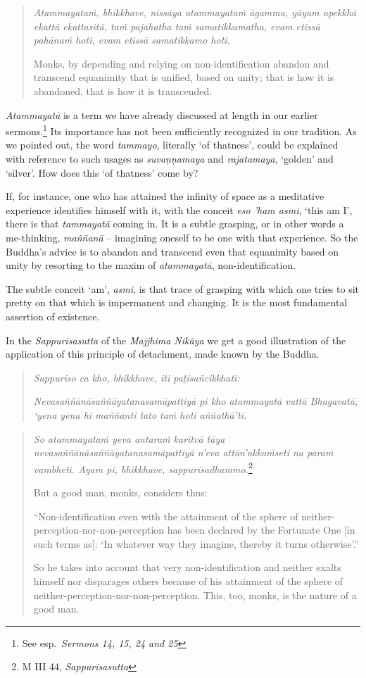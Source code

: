 \begin{quote}
\emph{Atammayataṁ, bhikkhave, nissāya atammayataṁ āgamma, yāyam upekkhā ekattā ekattasitā, taṁ pajahatha taṁ samatikkamatha, evam etissā pahānaṁ hoti, evam etissā samatikkamo hoti.}

Monks, by depending and relying on non-identification abandon and transcend equanimity that is unified, based on unity; that is how it is abandoned, that is how it is transcended.
\end{quote}

\emph{Atammayatā} is a term we have already discussed at length in our earlier sermons.\footnote{See esp.~\emph{Sermons 14, 15, 24 and 25}} Its importance has not been sufficiently recognized in our tradition. As we pointed out, the word \emph{tammayo}, literally `of thatness', could be explained with reference to such usages as \emph{suvaṇṇamaya} and \emph{rajatamaya}, `golden' and `silver'. How does this `of thatness' come by?

If, for instance, one who has attained the infinity of space as a meditative experience identifies himself with it, with the conceit \emph{eso 'ham asmi}, `this am I', there is that \emph{tammayatā} coming in. It is a subtle grasping, or in other words a me-thinking, \emph{maññanā} -- imagining oneself to be one with that experience. So the Buddha's advice is to abandon and transcend even that equanimity based on unity by resorting to the maxim of \emph{atammayatā}, non-identification.

The subtle conceit `am', \emph{asmi}, is that trace of grasping with which one tries to sit pretty on that which is impermanent and changing. It is the most fundamental assertion of existence.

In the \emph{Sappurisasutta} of the \emph{Majjhima Nikāya} we get a good illustration of the application of this principle of detachment, made known by the Buddha.

\begin{quote}
\emph{Sappuriso ca kho, bhikkhave, iti paṭisañcikkhati:}

\emph{Nevasaññānāsaññāyatanasamāpattiyā pi kho atammayatā vuttā Bhagavatā, `yena yena hi maññanti tato taṁ hoti aññathā'ti.}
\end{quote}

\begin{quote}
\emph{So atammayataṁ yeva antaraṁ karitvā tāya nevasaññānāsaññāyatanasamāpattiyā n'eva attān'ukkaṁseti na paraṁ vambheti. Ayam pi, bhikkhave, sappurisadhammo.}\footnote{M III 44, \emph{Sappurisasutta}}

But a good man, monks, considers thus:

``Non-identification even with the attainment of the sphere of neither-perception-nor-non-perception has been declared by the Fortunate One {[}in such terms as{]}: `In whatever way they imagine, thereby it turns otherwise'.''

So he takes into account that very non-identification and neither exalts himself nor disparages others because of his attainment of the sphere of neither-perception-nor-non-perception. This, too, monks, is the nature of a good man.
\end{quote}

